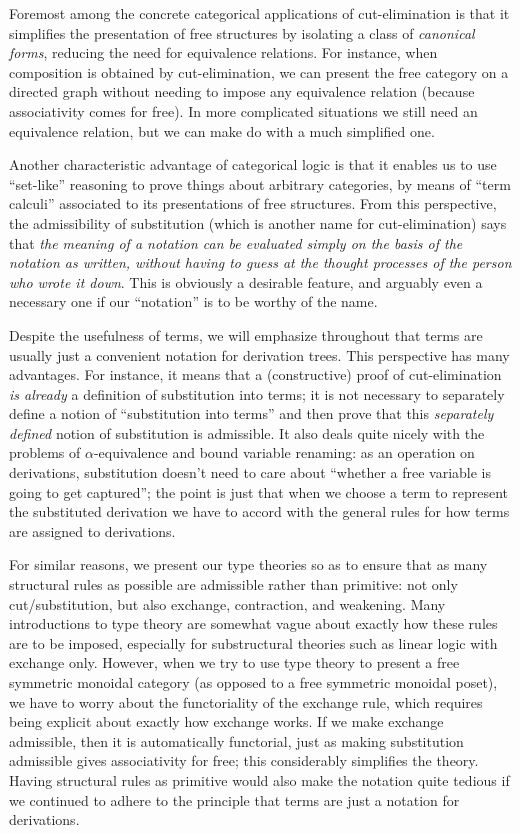 \documentclass{book}
\begin{document}
Foremost among the concrete categorical applications of cut-elimination is that it simplifies the presentation of free structures by isolating a class of \emph{canonical forms}, reducing the need for equivalence relations.
For instance, when composition is obtained by cut-elimination, we can present the free category on a directed graph without needing to impose any equivalence relation (because associativity comes for free).
In more complicated situations we still need an equivalence relation, but we can make do with a much simplified one.

Another characteristic advantage of categorical logic is that it enables us to use ``set-like'' reasoning to prove things about arbitrary categories, by means of ``term calculi'' associated to its presentations of free structures.
From this perspective, the admissibility of substitution (which is another name for cut-elimination) says that \emph{the meaning of a notation can be evaluated simply on the basis of the notation as written, without having to guess at the thought processes of the person who wrote it down}.
This is obviously a desirable feature, and arguably even a necessary one if our ``notation'' is to be worthy of the name.

Despite the usefulness of terms, we will emphasize throughout that terms are usually just a convenient notation for derivation trees.
This perspective has many advantages.
For instance, it means that a (constructive) proof of cut-elimination \emph{is already} a definition of substitution into terms; it is not necessary to separately define a notion of ``substitution into terms'' and then prove that this \emph{separately defined} notion of substitution is admissible.
It also deals quite nicely with the problems of $\alpha$-equivalence and bound variable renaming: as an operation on derivations, substitution doesn't need to care about ``whether a free variable is going to get captured''; the point is just that when we choose a term to represent the substituted derivation we have to accord with the general rules for how terms are assigned to derivations.

For similar reasons, we present our type theories so as to ensure that as many structural rules as possible are admissible rather than primitive: not only cut/substitution, but also exchange, contraction, and weakening.
Many introductions to type theory are somewhat vague about exactly how these rules are to be imposed, especially for substructural theories such as linear logic with exchange only.
However, when we try to use type theory to present a free symmetric monoidal category (as opposed to a free symmetric monoidal poset), we have to worry about the functoriality of the exchange rule, which requires being explicit about exactly how exchange works.
If we make exchange admissible, then it is automatically functorial, just as making substitution admissible gives associativity for free; this considerably simplifies the theory.
Having structural rules as primitive would also make the notation quite tedious if we continued to adhere to the principle that terms are just a notation for derivations.
\end{document}
